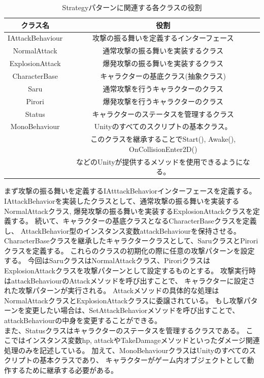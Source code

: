 \documentclass[dvipdfmx,fleqn,article]{jlreq}
\begin{document}
\begin{table}[H]
    \centering
    \begin{tabular}{|c|c|}
        \hline
        クラス名 & 役割 \\
        \hline
        IAttackBehaviour & 攻撃の振る舞いを定義するインターフェース \\
        \hline
        NormalAttack & 通常攻撃の振る舞いを実装するクラス \\
        \hline
        ExplosionAttack & 爆発攻撃の振る舞いを実装するクラス \\
        \hline
        CharacterBase & キャラクターの基底クラス(抽象クラス) \\
        \hline
        Saru & 通常攻撃を行うキャラクターのクラス \\
        \hline
        Pirori & 爆発攻撃を行うキャラクターのクラス \\      
        \hline
        Status & キャラクターのステータスを管理するクラス \\
        \hline
        MonoBehaviour & Unityのすべてのスクリプトの基本クラス。 \\
        & このクラスを継承することでStart(), Awake(), OnCollisionEnter2D()\\
        & などのUnityが提供するメソッドを使用できるようになる。 \\
        \hline
    \end{tabular}
    \caption{Strategyパターンに関連する各クラスの役割}
    \label{table:Strategy}  
\end{table}


まず攻撃の振る舞いを定義するIAtttackBehaviorインターフェースを定義する。
IAttackBehaviorを実装したクラスとして、通常攻撃の振る舞いを実装するNormalAttackクラス, 
爆発攻撃の振る舞いを実装するExplosionAttackクラスを定義する。
続いて、キャラクターの基底クラスとなるCharacterBaseクラスを定義し、
AttackBehavior型のインスタンス変数attackBehaviourを保持させる。
CharacterBaseクラスを継承したキャラクタークラスとして、SaruクラスとPiroriクラスを定義する。
これらのクラスの初期化の際に任意の攻撃パターンを設定する。
今回はSaruクラスはNormalAttackクラス、PiroriクラスはExplosionAttackクラスを攻撃パターンとして設定するものとする。
攻撃実行時はattackBehaviourのAttackメソッドを呼び出すことで、
キャラクターに設定された攻撃パターンが実行される。
Attackメソッドの具体的な処理はNormalAttackクラスとExplosionAttackクラスに委譲されている。
もし攻撃パターンを変更したい場合は、SetAttackBehaviorメソッドを呼び出すことで、
attackBehaviourの中身を変更することができる。\\
また、Statusクラスはキャラクターのステータスを管理するクラスである。
ここではインスタンス変数hp, attackやTakeDamageメソッドといったダメージ関連処理のみを記述している。
加えて、MonoBehaviourクラスはUnityのすべてのスクリプトの基本クラスであり、
キャラクターがゲーム内オブジェクトとして動作するために継承する必要がある。
\end{document}
